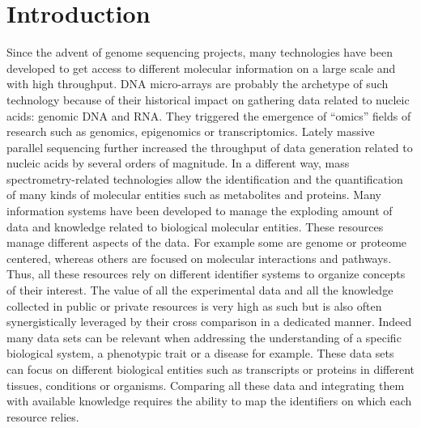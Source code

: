 \documentclass[9pt,a4paper,]{extarticle}
\theoremstyle{definition}
\theoremstyle{definition}
\theoremstyle{definition}
\theoremstyle{remark}
\begin{document}
\newcommand{\tm}{\textsuperscript{\textregistered}}
\newcommand{\neo}{Neo4j\tm{}}
\newcommand{\cypher}{Cypher\tm{}}
\newcommand{\docker}{Docker\tm{}}
\newcommand{\metabase}{MetaBase\tm{}}


\section{Introduction}\label{introduction}

Since the advent of genome sequencing projects, many technologies have been
developed to get access to different molecular information on a large scale
and with high throughput. DNA micro-arrays are probably the archetype of such
technology because of their historical impact on gathering data related
to nucleic acids: genomic DNA and RNA. They triggered the emergence of
``omics'' fields of research such as genomics, epigenomics or transcriptomics.
Lately massive parallel sequencing
further increased the throughput of data generation related to nucleic acids
by several orders of magnitude.
In a different way, mass spectrometry-related technologies allow the
identification and the quantification of many kinds of molecular entities
such as metabolites and proteins.
Many information systems have been developed to manage
the exploding amount of data and knowledge related to biological
molecular entities.
These resources manage different aspects of the data.
For example some are genome or proteome centered, whereas others
are focused on molecular interactions and pathways.
Thus, all these resources rely on different identifier systems to organize
concepts of their interest.
The value of all the experimental data and all the knowledge
collected in public or private resources is very high as such
but is also often synergistically leveraged by their cross comparison
in a dedicated manner. Indeed many data sets can be relevant when
addressing the understanding of a specific biological system, a phenotypic trait
or a disease for example. These data sets can focus on different biological
entities such as transcripts or proteins in different tissues, conditions
or organisms. Comparing all these data and integrating them with
available knowledge requires the ability to map the identifiers on which
each resource relies.
\end{document}
